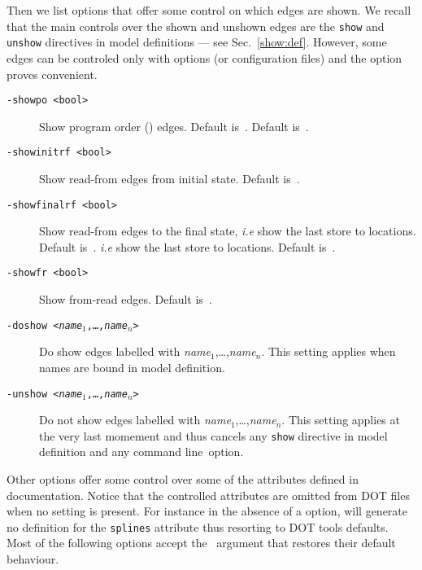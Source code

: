 Then we list options that offer some control on which edges are shown.
We recall that the main controls over the shown and unshown edges are
the \verb+show+ and \verb+unshow+ directives in model definitions ---
see Sec.~\ref{show:def}.
However, some edges can be controled only with options (or configuration
files) and the  option proves convenient.
\begin{description}
\item[{\tt -showpo <bool>}] Show program order () edges.
Default is~.
Default is~.
\item[{\tt -showinitrf <bool>}] Show read-from edges from initial state.
Default is~.
\item[{\tt -showfinalrf <bool>}] Show read-from edges to the final state,
\emph{i.e} show the last store to locations. Default is~.
\emph{i.e} show the last store to locations. Default is~.
\item[{\tt -showfr <bool>}] Show from-read edges. Default is~.
\item[{\tt -doshow <\textit{name}$_1$,\ldots,\textit{name}$_n$>}]
Do show edges labelled with \textit{name}$_1$,\ldots,\textit{name}$_n$.
This setting applies when names are bound in model definition.
\item[{\tt -unshow <\textit{name}$_1$,\ldots,\textit{name}$_n$>}]
Do not show edges labelled with \textit{name}$_1$,\ldots,\textit{name}$_n$.
This setting applies at the very last momement and thus cancels any
\verb+show+ directive in model definition and any  command
line~option.
\end{description}
Other options offer some control over some of the attributes defined in
 documentation.
Notice that the controlled attributes are omitted from DOT files
when no setting is present.
For instance in the absence of a  option, \herd{}
will generate no definition for the \texttt{splines} attribute thus
resorting to DOT tools defaults.
Most of the following
options accept the ~argument that restores their
default behaviour.
